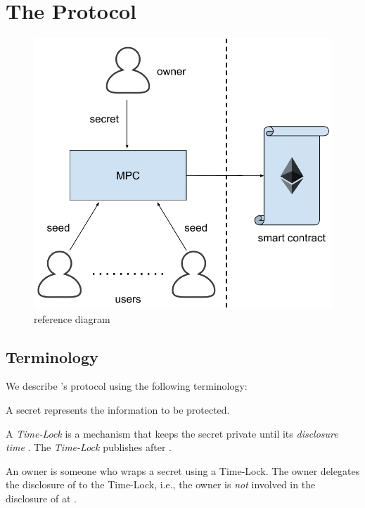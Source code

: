 \section{The {\em \shortname} Protocol}\label{sect:model}





\begin{figure}[tp]
\centering
\includegraphics[width=0.6\columnwidth]{fig/proposal}
\caption{\name reference diagram}
\label{fig:model}
\end{figure}

\subsection{Terminology}

We describe \shortname{}'s  protocol using the following terminology:


A secret \secret represents the information to be protected.

%
A \textit{Time-Lock} is a mechanism that keeps the secret \secret private until its {\em disclosure time} \td.
%
The \textit{Time-Lock} publishes \secret{}  after \td.

An owner \owner is someone who wraps a secret \secret using a Time-Lock.
%
The owner delegates the disclosure of \secret to the Time-Lock, i.e., the owner is \textit{not} involved in the disclosure of \secret at \td.



